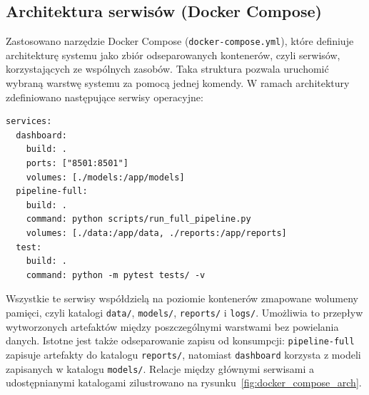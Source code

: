 \subsection{Architektura serwisów (Docker Compose)}
\label{subsec:architektura-serwisow-docker-compose}

Zastosowano narzędzie Docker Compose (\texttt{docker-compose.yml}), które definiuje architekturę systemu jako zbiór odseparowanych kontenerów, czyli serwisów, korzystających ze wspólnych zasobów. Taka struktura pozwala uruchomić wybraną warstwę systemu za pomocą jednej komendy. W ramach architektury zdefiniowano następujące serwisy operacyjne:

\begin{lstlisting}[caption={Kluczowe definicje serwisów wyizolowane w architekturze docker-compose.yml},label={lst:docker-compose-services}]
services:
  dashboard:
    build: .
    ports: ["8501:8501"]
    volumes: [./models:/app/models]
  pipeline-full:
    build: .
    command: python scripts/run_full_pipeline.py
    volumes: [./data:/app/data, ./reports:/app/reports]
  test:
    build: .
    command: python -m pytest tests/ -v
\end{lstlisting}

Wszystkie te serwisy współdzielą na poziomie kontenerów zmapowane wolumeny pamięci, czyli katalogi \texttt{data/}, \texttt{models/}, \texttt{reports/} i \texttt{logs/}. Umożliwia to przepływ wytworzonych artefaktów między poszczególnymi warstwami bez powielania danych. Istotne jest także odseparowanie zapisu od konsumpcji: \texttt{pipeline-full} zapisuje artefakty do katalogu \texttt{reports/}, natomiast \texttt{dashboard} korzysta z modeli zapisanych w katalogu \texttt{models/}. Relacje między głównymi serwisami a udostępnianymi katalogami zilustrowano na rysunku~\ref{fig:docker_compose_arch}.

